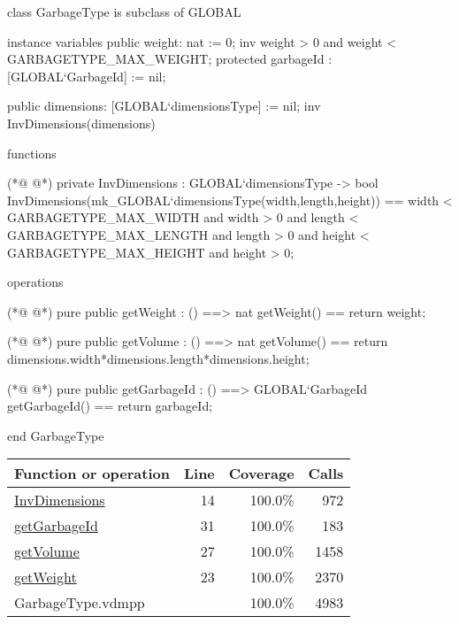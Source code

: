 \begin{vdmpp}[breaklines=true]
class GarbageType is subclass of GLOBAL

instance variables
public weight: nat := 0; 
inv weight > 0 and weight < GARBAGETYPE_MAX_WEIGHT;
protected garbageId : [GLOBAL`GarbageId] := nil;


public dimensions: [GLOBAL`dimensionsType] := nil;
inv InvDimensions(dimensions)

functions

(*@
\label{InvDimensions:14}
@*)
private InvDimensions : GLOBAL`dimensionsType -> bool
InvDimensions(mk_GLOBAL`dimensionsType(width,length,height)) == 
        width < GARBAGETYPE_MAX_WIDTH and width > 0 and   
        length < GARBAGETYPE_MAX_LENGTH and length > 0 and
        height < GARBAGETYPE_MAX_HEIGHT and height > 0;


operations

(*@
\label{getWeight:23}
@*)
pure public getWeight : () ==> nat
getWeight() == 
    return weight;

(*@
\label{getVolume:27}
@*)
pure public getVolume : () ==> nat
getVolume() ==
    return dimensions.width*dimensions.length*dimensions.height;

(*@
\label{getGarbageId:31}
@*)
pure public getGarbageId : () ==> GLOBAL`GarbageId
getGarbageId() ==
    return garbageId;

end GarbageType
\end{vdmpp}
\bigskip
\begin{longtable}{|l|r|r|r|}
\hline
Function or operation & Line & Coverage & Calls \\
\hline
\hline
\hyperref[InvDimensions:14]{InvDimensions} & 14&100.0\% & 972 \\
\hline
\hyperref[getGarbageId:31]{getGarbageId} & 31&100.0\% & 183 \\
\hline
\hyperref[getVolume:27]{getVolume} & 27&100.0\% & 1458 \\
\hline
\hyperref[getWeight:23]{getWeight} & 23&100.0\% & 2370 \\
\hline
\hline
GarbageType.vdmpp & & 100.0\% & 4983 \\
\hline
\end{longtable}

